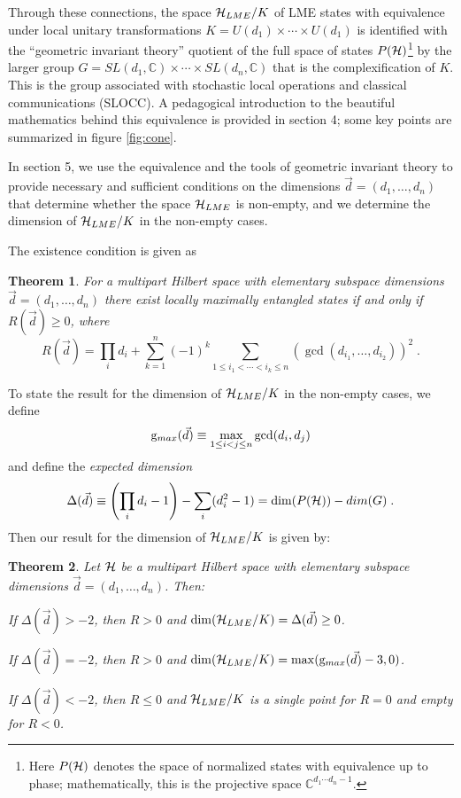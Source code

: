 \documentclass[12pt]{article}
\newtheorem{theorem}{Theorem}[section]
\theoremstyle{definition}
\newcommand{\be}{\begin{equation}}
\newcommand{\ee}{\end{equation}}
\begin{document}
Through these connections, the space ${\cal H}_{LME}/K$ of LME states with equivalence under local unitary transformations $K = U(d_1) \times \cdots \times U(d_1)$ is identified with the ``geometric invariant theory'' quotient of the full space of states $P({\cal H})$\footnote{Here $P({\cal H})$ denotes the space of normalized states with equivalence up to phase; mathematically, this is the projective space $\mathbb{C}^{d_1 \cdots d_n -1}$.} by the larger group $G = SL(d_1, \mathbb{C}) \times \cdots \times SL(d_n, \mathbb{C})$ that is the complexification of $K$. This is the group associated with stochastic local operations and classical communications (SLOCC). A pedagogical introduction to the beautiful mathematics behind this equivalence is provided in section 4; some key points are summarized in figure \ref{fig:cone}.

In section 5, we use the equivalence and the tools of geometric invariant theory to provide necessary and sufficient conditions on the dimensions $\vec{d} = (d_1, \dots, d_n)$ that determine whether the space ${\cal H}_{LME}$ is non-empty, and we determine the dimension of ${\cal H}_{LME}/K$ in the non-empty cases.

The existence condition is given as
\begin{theorem}\label{thm.R}
For a multipart Hilbert space with elementary subspace dimensions $\vec{d} = (d_1, \dots, d_n)$ there exist locally maximally entangled states if and only if $R(\vec{d}) \ge 0$, where
\be
R(\vec{d}) = \prod_i d_i + \sum_{k=1}^n (-1)^k \sum_{1 \le i_1 < \cdots < i_k \le n} (\gcd(d_{i_1},\dots,d_{i_2}))^2 \; .
\ee
\end{theorem}
To state the result for the dimension of ${\cal H}_{LME}/K$ in the non-empty cases,  we define
\be
\label{gmd}
{\rm g}_{max}(\vec{d}) \equiv \max_{1 \le i < j \le n} \gcd(d_i,d_j)
\ee
and define the {\it expected dimension}
\be
\Delta(\vec{d}) \equiv \left(\prod_i d_i - 1\right) - \sum_i (d_i^2 - 1) = \dim(P({\cal H})) - dim(G) \; .
\ee
Then our result for the dimension of ${\cal H}_{LME}/K$ is given by:
\begin{theorem}\label{thm.dims}
Let ${\cal H}$ be a multipart Hilbert space with elementary subspace dimensions $\vec{d} = (d_1, \dots, d_n)$. Then:

If $\Delta(\vec{d}) > -2$, then $R > 0$ and $\dim({\cal H}_{LME}/K) = \Delta(\vec{d}) \ge 0$.

If $\Delta(\vec{d}) = -2$, then $R > 0$ and $\dim({\cal H}_{LME}/K)  = \max ({\rm g}_{max}(\vec{d}) -3,0)$.

If $\Delta(\vec{d}) < -2$, then $R \le 0$ and ${\cal H}_{LME}/K$ is a single point for $R=0$ and empty for $R<0$.
\end{theorem}
\end{document}
